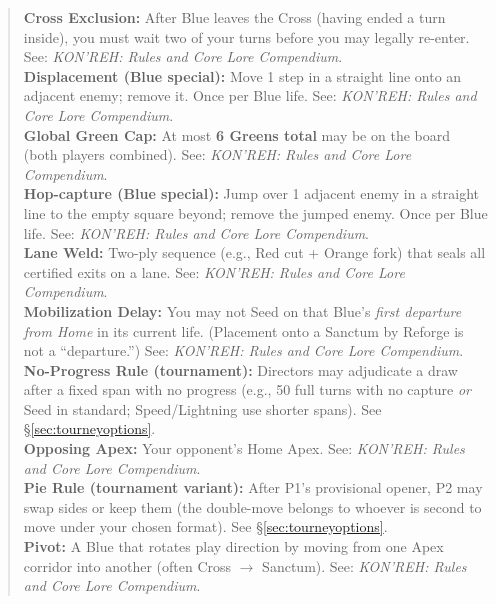 \documentclass[11pt]{article}
\begin{document}
\begin{quote}
\textbf{Cross Exclusion:} After Blue leaves the Cross (having ended a turn inside), you must wait two of your turns before you may legally re-enter. See: \textit{KON’REH: Rules and Core Lore Compendium}.\\

\textbf{Displacement (Blue special):} Move 1 step in a straight line onto an adjacent enemy; remove it. Once per Blue life. See: \textit{KON’REH: Rules and Core Lore Compendium}.\\

\textbf{Global Green Cap:} At most \textbf{6 Greens total} may be on the board (both players combined). See: \textit{KON’REH: Rules and Core Lore Compendium}.\\

\textbf{Hop-capture (Blue special):} Jump over 1 adjacent enemy in a straight line to the empty square beyond; remove the jumped enemy. Once per Blue life. See: \textit{KON’REH: Rules and Core Lore Compendium}.\\

\textbf{Lane Weld:} Two-ply sequence (e.g., Red cut + Orange fork) that seals all certified exits on a lane. See: \textit{KON’REH: Rules and Core Lore Compendium}.\\

\textbf{Mobilization Delay:} You may not Seed on that Blue’s \emph{first departure from Home} in its current life. (Placement onto a Sanctum by Reforge is not a “departure.”) See: \textit{KON’REH: Rules and Core Lore Compendium}.\\

\textbf{No-Progress Rule (tournament):} Directors may adjudicate a draw after a fixed span with no progress (e.g., 50 full turns with no capture \emph{or} Seed in standard; Speed/Lightning use shorter spans). See \S\ref{sec:tourneyoptions}.\\

\textbf{Opposing Apex:} Your opponent’s Home Apex. See: \textit{KON’REH: Rules and Core Lore Compendium}.\\

\textbf{Pie Rule (tournament variant):} After P1’s provisional opener, P2 may swap sides or keep them (the double-move belongs to whoever is second to move under your chosen format). See \S\ref{sec:tourneyoptions}.\\

\textbf{Pivot:} A Blue that rotates play direction by moving from one Apex corridor into another (often Cross $\rightarrow$ Sanctum). See: \textit{KON’REH: Rules and Core Lore Compendium}.\\


\end{quote}
\end{document}
